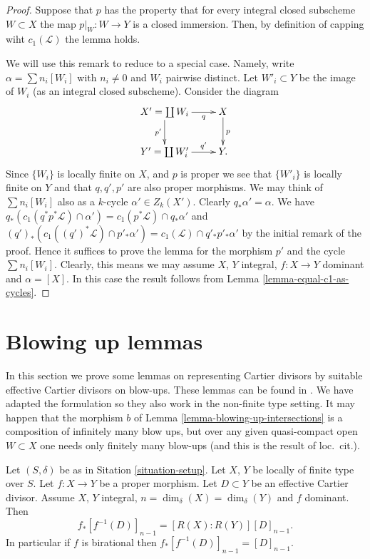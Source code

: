 \begin{proof}
Suppose that $p$ has the property that for every integral
closed subscheme $W \subset X$ the map $p|_W : W \to Y$
is a closed immersion. Then, by definition of capping
wiht $c_1(\mathcal{L})$ the lemma holds.

\medskip\noindent
We will use this remark to reduce to a special case. Namely,
write $\alpha = \sum n_i[W_i]$ with $n_i \not = 0$ and $W_i$ pairwise
distinct. Let $W'_i \subset Y$ be the image of $W_i$ (as an integral
closed subscheme). Consider the diagram
$$
\xymatrix{
X' = \coprod W_i \ar[r]_-q \ar[d]_{p'} & X \ar[d]^p \\
Y' = \coprod W'_i \ar[r]^-{q'} & Y.
}
$$
Since $\{W_i\}$ is locally finite on $X$, and $p$ is proper
we see that $\{W'_i\}$ is locally finite on $Y$ and that
$q, q', p'$ are also proper morphisms.
We may think of $\sum n_i[W_i]$ also as a $k$-cycle
$\alpha' \in Z_k(X')$. Clearly $q_*\alpha' = \alpha$.
We have
$q_*(c_1(q^*p^*\mathcal{L}) \cap \alpha')
= c_1(p^*\mathcal{L}) \cap q_*\alpha'$
and
$(q')_*(c_1((q')^*\mathcal{L}) \cap p'_*\alpha') =
c_1(\mathcal{L}) \cap q'_*p'_*\alpha'$ by the initial
remark of the proof. Hence it suffices to prove the lemma
for the morphism $p'$ and the cycle $\sum n_i[W_i]$.
Clearly, this means we may assume $X$, $Y$ integral,
$f : X \to Y$ dominant and $\alpha = [X]$.
In this case the result follows from
Lemma \ref{lemma-equal-c1-as-cycles}.
\end{proof}










\section{Blowing up lemmas}
\label{section-blowing-up-lemmas}

\noindent
In this section we prove some lemmas on representing
Cartier divisors by suitable effective Cartier divisors
on blow-ups. These lemmas can be found in \cite[Section 2.4]{F}.
We have adapted the formulation so they also work
in the non-finite type setting. It may happen that the morphism $b$
of Lemma \ref{lemma-blowing-up-intersections} is a composition of
infinitely many blow ups, but over any given quasi-compact open
$W \subset X$ one needs only finitely many blow-ups
(and this is the result of loc.\ cit.).

\begin{lemma}
\label{lemma-push-pull-effective-Cartier}
Let $(S, \delta)$ be as in Sitation \ref{situation-setup}.
Let $X$, $Y$ be locally of finite type over $S$.
Let $f : X \to Y$ be a proper morphism.
Let $D \subset Y$ be an effective Cartier divisor.
Assume $X$, $Y$ integral, $n = \dim_\delta(X) = \dim_\delta(Y)$ and
$f$ dominant. Then
$$
f_*[f^{-1}(D)]_{n - 1} = [R(X) : R(Y)] [D]_{n - 1}.
$$
In particular if $f$ is birational then $f_*[f^{-1}(D)]_{n - 1} = [D]_{n - 1}$.
\end{lemma}

